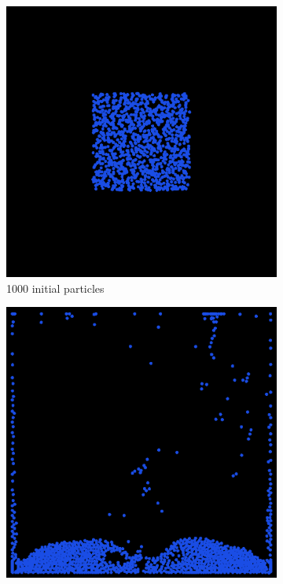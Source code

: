 \begin{figure}[h]
    \centering
    \begin{subfigure}[b]{0.2\textwidth}
        \includegraphics[width=\textwidth]{figures/apic1000_init.png}
        \caption{1000 initial particles}
    \end{subfigure}
    \hspace{1em}
    \begin{subfigure}[b]{0.2\textwidth}
        \includegraphics[width=\textwidth]{figures/apic1000.png}

\end{subfigure}
\end{figure}
